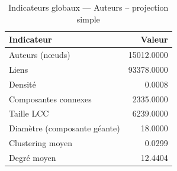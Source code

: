 \begin{table}
\caption{Indicateurs globaux — Auteurs – projection simple}
\label{tab:global_result_auteur_simple}
\begin{tabular}{lr}
\toprule
Indicateur & Valeur \\
\midrule
Auteurs (nœuds) & 15012.0000 \\
Liens & 93378.0000 \\
Densité & 0.0008 \\
Composantes connexes & 2335.0000 \\
Taille LCC & 6239.0000 \\
Diamètre (composante géante) & 18.0000 \\
Clustering moyen & 0.0299 \\
Degré moyen & 12.4404 \\
\bottomrule
\end{tabular}
\end{table}
